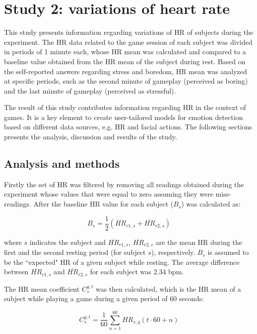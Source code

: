 \section{Study 2: variations of heart rate}

This study presents information regarding variations of HR of subjects during the experiment. The HR data related to the game session of each subject was divided in periods of 1 minute each, whose HR mean was calculated and compared to a baseline value obtained from the HR mean of the subject during rest. Based on the self-reported answers regarding stress and boredom, HR mean was analyzed at specific periods, such as the second minute of gameplay (perceived as boring) and the last minute of gameplay (perceived as stressful).

The result of this study contributes information regarding HR in the context of games. It is a key element to create user-tailored models for emotion detection based on different data sources, e.g. HR and facial actions. The following sections presents the analysis, discussion and results of the study.

\subsection{Analysis and methods}
\label{s:study2-methodology}

Firstly the set of HR was filtered by removing all readings obtained during the experiment whose values that were equal to zero assuming they were miss-readings. After the baseline HR value for each subject ($B_s$) was calculated as:

\begin{equation} \label{eq:baseline}
B_s = \frac{1}{2}(\overline{HR}_{r1,s} + \overline{HR}_{r2,s})
\end{equation}

where $s$ indicates the subject and $\overline{HR}_{r1,s}$, $\overline{HR}_{r2,s}$ are the mean HR during the first and the second resting period (for subject $s$), respectively. $B_s$ is assumed to be the ``expected" HR of a given subject while resting. The average difference between $\overline{HR}_{r1,s}$ and $\overline{HR}_{r2,s}$ for each subject was 2.34 bpm.

The HR mean coefficient $C_s^{g,t}$ was then calculated, which is the HR mean of a subject while playing a game during a given period of 60 seconds:

\begin{equation} \label{eq:variation}
C_s^{g,t} = \frac{1}{60}\sum_{n=1}^{60} HR_{s,g}(t\cdot 60 + n)
\end{equation}

